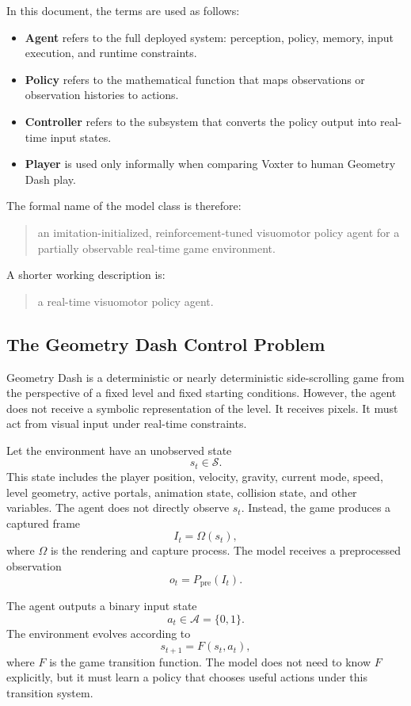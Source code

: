 \documentclass[11pt]{article}
\newcommand{\Ppre}{P_{\mathrm{pre}}}
\begin{document}
In this document, the terms are used as follows:
\begin{itemize}
  \item \textbf{Agent} refers to the full deployed system: perception, policy, memory, input execution, and runtime constraints.
  \item \textbf{Policy} refers to the mathematical function that maps observations or observation histories to actions.
  \item \textbf{Controller} refers to the subsystem that converts the policy output into real-time input states.
  \item \textbf{Player} is used only informally when comparing Voxter to human Geometry Dash play.
\end{itemize}

The formal name of the model class is therefore:
\begin{quote}
an imitation-initialized, reinforcement-tuned visuomotor policy agent for a partially observable real-time game environment.
\end{quote}

A shorter working description is:
\begin{quote}
a real-time visuomotor policy agent.
\end{quote}

\subsection{The Geometry Dash Control Problem}

Geometry Dash is a deterministic or nearly deterministic side-scrolling game from the perspective of a fixed level and fixed starting conditions. However, the agent does not receive a symbolic representation of the level. It receives pixels. It must act from visual input under real-time constraints.

Let the environment have an unobserved state
\[
  s_t \in \mathcal{S}.
\]
This state includes the player position, velocity, gravity, current mode, speed, level geometry, active portals, animation state, collision state, and other variables. The agent does not directly observe \(s_t\). Instead, the game produces a captured frame
\[
  I_t = \Omega(s_t),
\]
where \(\Omega\) is the rendering and capture process. The model receives a preprocessed observation
\[
  o_t = \Ppre(I_t).
\]

The agent outputs a binary input state
\[
  a_t \in \mathcal{A} = \{0,1\}.
\]
The environment evolves according to
\[
  s_{t+1} = F(s_t,a_t),
\]
where \(F\) is the game transition function. The model does not need to know \(F\) explicitly, but it must learn a policy that chooses useful actions under this transition system.
\end{document}
